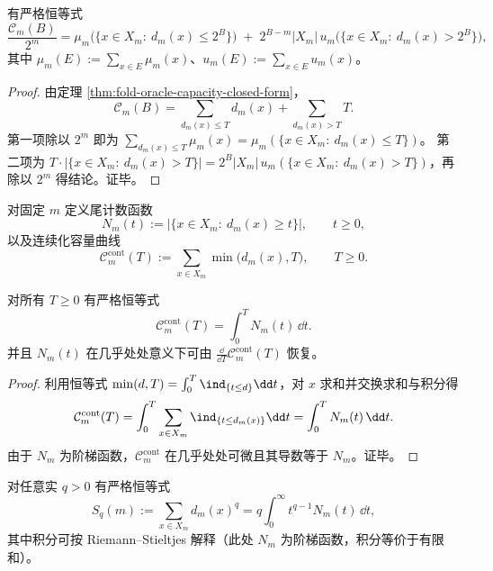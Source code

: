 \begin{proposition}[容量的双测度恒等式]\label{prop:fold-oracle-capacity-bimeasure-identity}
有严格恒等式
\[
\frac{\mathcal{C}_m(B)}{2^m}
=\mu_m\bigl(\{x\in X_m:\ d_m(x)\le 2^B\}\bigr)
\;+\;2^{B-m}|X_m|\,u_m\bigl(\{x\in X_m:\ d_m(x)>2^B\}\bigr),
\]
其中 \(\mu_m(E):=\sum_{x\in E}\mu_m(x)\)、\(u_m(E):=\sum_{x\in E}u_m(x)\)。
\end{proposition}

\begin{proof}
由定理 \ref{thm:fold-oracle-capacity-closed-form}，
\[
\mathcal{C}_m(B)=\sum_{d_m(x)\le T} d_m(x)+\sum_{d_m(x)>T}T.
\]
第一项除以 \(2^m\) 即为 \(\sum_{d_m(x)\le T}\mu_m(x)=\mu_m(\{x\in X_m:\ d_m(x)\le T\})\)。
第二项为 \(T\cdot|\{x\in X_m:\ d_m(x)>T\}|=2^B|X_m|\,u_m(\{x\in X_m:\ d_m(x)>T\})\)，再除以 \(2^m\) 得结论。证毕。
\end{proof}

\begin{definition}[尾计数函数与连续容量曲线]\label{def:fold-capacity-tail}
对固定 \(m\) 定义尾计数函数
\[
N_m(t):=\bigl|\{x\in X_m:\ d_m(x)\ge t\}\bigr|,\qquad t\ge 0,
\]
以及连续化容量曲线
\[
\mathcal{C}_m^{\mathrm{cont}}(T):=\sum_{x\in X_m}\min\bigl(d_m(x),T\bigr),\qquad T\ge 0.
\]
\end{definition}

\begin{proposition}[容量—尾函数等价]\label{prop:fold-capacity-tail-equivalence}
对所有 \(T\ge 0\) 有严格恒等式
\[
\mathcal{C}_m^{\mathrm{cont}}(T)=\int_{0}^{T} N_m(t)\,\dd t.
\]
并且 \(N_m(t)\) 在几乎处处意义下可由 \(\frac{\dd}{\dd T}\mathcal{C}_m^{\mathrm{cont}}(T)\) 恢复。
\end{proposition}

\begin{proof}
利用恒等式 \(\min(d,T)=\int_{0}^{T}\ind_{\{t\le d\}}\dd t\)，对 \(x\) 求和并交换求和与积分得
\[
\mathcal{C}_m^{\mathrm{cont}}(T)=\int_{0}^{T}\sum_{x\in X_m}\ind_{\{t\le d_m(x)\}}\dd t
=\int_{0}^{T}N_m(t)\,\dd t.
\]
由于 \(N_m\) 为阶梯函数，\(\mathcal{C}_m^{\mathrm{cont}}\) 在几乎处处可微且其导数等于 \(N_m\)。证毕。
\end{proof}

\begin{proposition}\label{prop:fold-moment-mellin-stieltjes}
对任意实 \(q>0\) 有严格恒等式
\[
S_q(m):=\sum_{x\in X_m} d_m(x)^q
=q\int_{0}^{\infty} t^{q-1}N_m(t)\,\dd t,
\]
其中积分可按 Riemann--Stieltjes 解释（此处 \(N_m\) 为阶梯函数，积分等价于有限和）。
\end{proposition}

